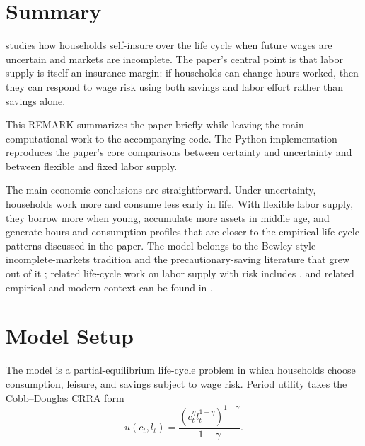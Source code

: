 \documentclass[titlepage, headings=optiontotocandhead]{econark} %
\begin{document}

\titlepagefinish

\pagebreak


\section{Summary}
\citet{Low2005} studies how households self-insure over the life cycle when future wages are
uncertain and markets are incomplete. The paper's central point is that labor
supply is itself an insurance margin: if households can change hours worked, then they can
respond to wage risk using both savings and labor effort rather than savings alone.

This REMARK summarizes the paper briefly while leaving the main computational work to the
accompanying code. The Python implementation reproduces the paper's core comparisons
between certainty and uncertainty and between flexible and fixed labor supply.

The main economic conclusions are straightforward. Under uncertainty, households work more
and consume less early in life. With flexible labor supply, they borrow more when young,
accumulate more assets in middle age, and generate hours and consumption profiles that are
closer to the empirical life-cycle patterns discussed in the paper.
The model belongs to the Bewley-style incomplete-markets tradition
\citep{Huggett1993Low, Aiyagari1994Low} and the precautionary-saving
literature that grew out of it
\citep{Kimball1990Low, Carroll1997Low, CarrollSamwick1997Low};
related life-cycle work on labor supply with risk includes
\citet{ImaiKeane2004Low, PijoanMas2006Low, DomeijFloden2006Low, ErosaFusterKambourov2016Low},
and related empirical and modern context can be found in
\citet{HeathcoteStoreslettenViolante2010Low, Chetty2012Low, KaplanMollViolante2018Low}.

\section{Model Setup}
The model is a partial-equilibrium life-cycle problem in which households choose consumption,
leisure, and savings subject to wage risk. Period utility takes the Cobb--Douglas CRRA form
\begin{equation}
  u(c_t,l_t)=\frac{\left(c_t^{\eta} l_t^{1-\eta}\right)^{1-\gamma}}{1-\gamma}.
\end{equation}
\end{document}
